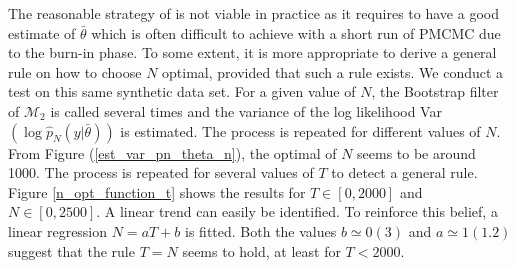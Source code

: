 \documentclass[11pt,a4,twosided,singlespacing,titlepagenumber=on]{scrreprt}
\numberwithin{equation}{chapter} %
\theoremstyle{remark}
\begin{document}
The reasonable strategy of \cite{pitt2012} is not viable in practice as it requires to have a good estimate of $\bar{\theta}$ which is often difficult to achieve with a short run of PMCMC due to the burn-in phase. To some extent, it is more appropriate to derive a general rule on how to choose $N$ optimal, provided that such a rule exists. We conduct a test on this same synthetic data set. For a given value of $N$, the Bootstrap filter of $\mathcal{M}_2$ is called several times and the variance of the log likelihood Var$(\log \hat{p}_N(y|\bar{\theta}))$ is estimated. The process is repeated for different values of $N$. From Figure (\ref{est_var_pn_theta_n}), the optimal of $N$ seems to be around 1000. The process is repeated for several values of $T$ to detect a general rule. Figure \ref{n_opt_function_t} shows the results for $T \in [0, 2000]$ and $N \in [0, 2500]$. A linear trend can easily be identified. To reinforce this belief, a linear regression $N = a T + b$ is fitted. Both the values $b \simeq 0 (3)$ and $a \simeq 1 (1.2)$ suggest that the rule $T = N$ seems to hold, at least for $T < 2000$.
\end{document}
